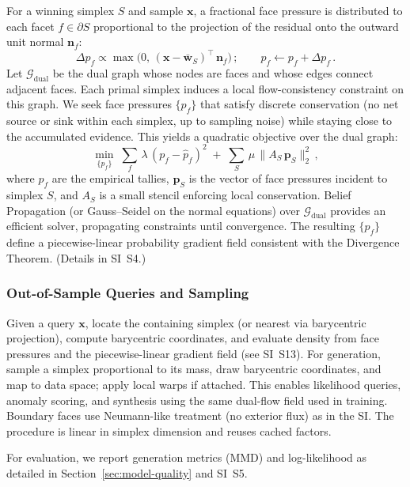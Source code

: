 \documentclass[11pt]{article}
\begin{document}
For a winning simplex $S$ and sample $\mathbf x$, a fractional face pressure is distributed to each facet $f\in\partial S$ proportional to the projection of the residual onto the outward unit normal $\mathbf n_f$:
\[
\Delta p_f \propto \max\big(0,\, (\mathbf x{-}\bar{\mathbf w}_S)^{\top}\,\mathbf n_f\big)\,;\qquad p_f \leftarrow p_f + \Delta p_f\,.
\]
Let $\mathcal G_\mathrm{dual}$ be the dual graph whose nodes are faces and whose edges connect adjacent faces. Each primal simplex induces a local flow-consistency constraint on this graph. We seek face pressures $\{p_f\}$ that satisfy discrete conservation (no net source or sink within each simplex, up to sampling noise) while staying close to the accumulated evidence. This yields a quadratic objective over the dual graph:
\[
\min_{\{p_f\}}\; \sum_{f}\,\lambda\, (p_f{-}\hat p_f)^2\; +\; \sum_{S}\,\mu\,\big\lVert A_S\,\mathbf p_S\big\rVert_2^2\,,
\]
where $\hat p_f$ are the empirical tallies, $\mathbf p_S$ is the vector of face pressures incident to simplex $S$, and $A_S$ is a small stencil enforcing local conservation. Belief Propagation (or Gauss–Seidel on the normal equations) over $\mathcal G_\mathrm{dual}$ provides an efficient solver, propagating constraints until convergence. The resulting $\{p_f\}$ define a piecewise-linear probability gradient field consistent with the Divergence Theorem.
(Details in SI~S4.)

\subsubsection{Out-of-Sample Queries and Sampling}
Given a query $\mathbf x$, locate the containing simplex (or nearest via barycentric projection), compute barycentric coordinates, and evaluate density from face pressures and the piecewise-linear gradient field (see SI~S13). For generation, sample a simplex proportional to its mass, draw barycentric coordinates, and map to data space; apply local warps if attached. This enables likelihood queries, anomaly scoring, and synthesis using the same dual-flow field used in training. Boundary faces use Neumann-like treatment (no exterior flux) as in the SI. The procedure is linear in simplex dimension and reuses cached factors.

For evaluation, we report generation metrics (MMD) and log-likelihood as detailed in Section~\ref{sec:model-quality} and SI~S5.
\end{document}
